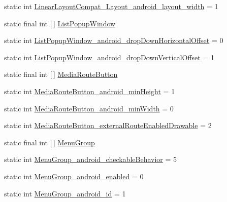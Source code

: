 \begin{DoxyCompactItemize}
\item 
static int \hyperlink{classandroid_1_1support_1_1v7_1_1cardview_1_1R_1_1styleable_ad6fbb71f28fd79d9a51d3b100d80b56f}{Linear\+Layout\+Compat\+\_\+\+Layout\+\_\+android\+\_\+layout\+\_\+width} = 1
\item 
static final int \mbox{[}$\,$\mbox{]} \hyperlink{classandroid_1_1support_1_1v7_1_1cardview_1_1R_1_1styleable_a7cfe822c983ad9ac00d6f47da2fb0ee4}{List\+Popup\+Window}
\item 
static int \hyperlink{classandroid_1_1support_1_1v7_1_1cardview_1_1R_1_1styleable_a76e93c74efacea206f4f7eea287ea29e}{List\+Popup\+Window\+\_\+android\+\_\+drop\+Down\+Horizontal\+Offset} = 0
\item 
static int \hyperlink{classandroid_1_1support_1_1v7_1_1cardview_1_1R_1_1styleable_a20bb7afcc21fceebe839a1c04c8a648b}{List\+Popup\+Window\+\_\+android\+\_\+drop\+Down\+Vertical\+Offset} = 1
\item 
static final int \mbox{[}$\,$\mbox{]} \hyperlink{classandroid_1_1support_1_1v7_1_1cardview_1_1R_1_1styleable_a90da384eb909a4e564e04a5ea394df19}{Media\+Route\+Button}
\item 
static int \hyperlink{classandroid_1_1support_1_1v7_1_1cardview_1_1R_1_1styleable_a9c1814d26c4c44bbbf65dfb6f0a8c576}{Media\+Route\+Button\+\_\+android\+\_\+min\+Height} = 1
\item 
static int \hyperlink{classandroid_1_1support_1_1v7_1_1cardview_1_1R_1_1styleable_a0d6a2bbf7eac89cdb181bdee1f0054cd}{Media\+Route\+Button\+\_\+android\+\_\+min\+Width} = 0
\item 
static int \hyperlink{classandroid_1_1support_1_1v7_1_1cardview_1_1R_1_1styleable_ae978630e03770b486c54d3274c7ca28c}{Media\+Route\+Button\+\_\+external\+Route\+Enabled\+Drawable} = 2
\item 
static final int \mbox{[}$\,$\mbox{]} \hyperlink{classandroid_1_1support_1_1v7_1_1cardview_1_1R_1_1styleable_aec12064c9ec8c2dea3c20674737c17ed}{Menu\+Group}
\item 
static int \hyperlink{classandroid_1_1support_1_1v7_1_1cardview_1_1R_1_1styleable_a47c0a1dd97fa43be472968afe500af28}{Menu\+Group\+\_\+android\+\_\+checkable\+Behavior} = 5
\item 
static int \hyperlink{classandroid_1_1support_1_1v7_1_1cardview_1_1R_1_1styleable_a4195a921bff15fe1e37ecda8bce29889}{Menu\+Group\+\_\+android\+\_\+enabled} = 0
\item 
static int \hyperlink{classandroid_1_1support_1_1v7_1_1cardview_1_1R_1_1styleable_ae63e63deefe7da406c1ca9fb9da2b287}{Menu\+Group\+\_\+android\+\_\+id} = 1

\end{DoxyCompactItemize}
